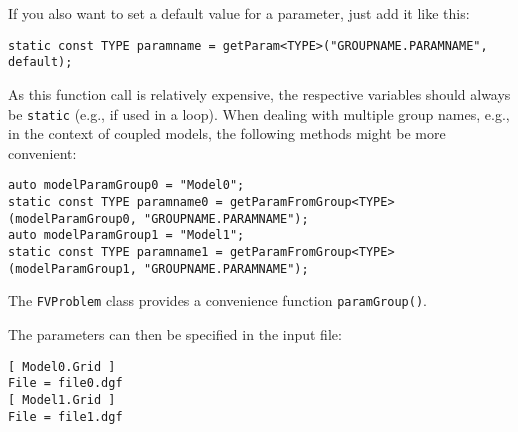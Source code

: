 If you also want to set a default value for a parameter, just add it like this:

\begin{lstlisting}[name=propsyscars,style=DumuxCode]
static const TYPE paramname = getParam<TYPE>("GROUPNAME.PARAMNAME", default);
\end{lstlisting}

As this function call is relatively expensive, the respective variables should always be \texttt{static} (e.g., if used in a loop). When dealing with multiple group names, e.g., in the context of coupled models, the following methods might be more convenient:

\begin{lstlisting}[name=propsyscars,style=DumuxCode]
auto modelParamGroup0 = "Model0";
static const TYPE paramname0 = getParamFromGroup<TYPE>(modelParamGroup0, "GROUPNAME.PARAMNAME");
auto modelParamGroup1 = "Model1";
static const TYPE paramname1 = getParamFromGroup<TYPE>(modelParamGroup1, "GROUPNAME.PARAMNAME");
\end{lstlisting}

The \texttt{FVProblem} class provides a convenience function \texttt{paramGroup()}.

The parameters can then be specified in the input file:

\begin{lstlisting}[style=Bash]
[ Model0.Grid ]
File = file0.dgf
[ Model1.Grid ]
File = file1.dgf
\end{lstlisting}
